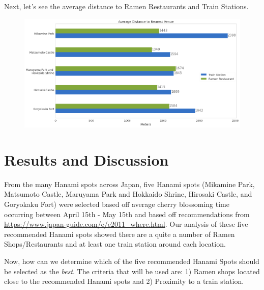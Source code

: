 \documentclass[11pt]{article}
\begin{document}
    
    Next, let's see the average distance to Ramen Restaurants and Train
Stations.

\begin{figure}[H]
  \centering
  \includegraphics[]{images/Average_Venue_Distance.png}
  \caption{}
\end{figure}
    
    \hypertarget{results-and-discussion}{%
\section{Results and Discussion}}\label{results-and-discussion}

    From the many Hanami spots across Japan, five Hanami spots (Mikamine
Park, Matsumoto Castle, Maruyama Park and Hokkaido Shrine, Hirosaki
Castle, and Goryokaku Fort) were selected based off average cherry
blossoming time occurring between April 15th - May 15th and based off
recommendations from
\url{https://www.japan-guide.com/e/e2011_where.html}. Our analysis of
these five recommended Hanami spots showed there are a quite a number of
Ramen Shops/Restaurants and at least one train station around each
location.

Now, how can we determine which of the five recommended Hanami Spots
should be selected as the \emph{best}. The criteria that will be used are:
1) Ramen shops located close to the recommended Hanami spots and 2)
Proximity to a train station.
\end{document}

